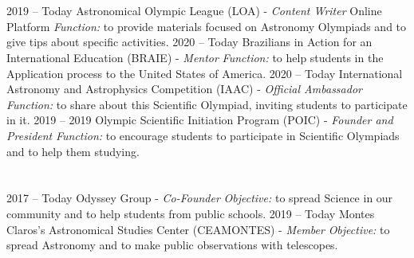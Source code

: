 \documentclass{cv}
\begin{document}
    \section*{}
        \begin{entrylist}
            \entry
                {2019 -- Today}
                {Astronomical Olympic League (LOA) - \textit{Content Writer}}
                {Online Platform}
                {\textit{Function:} to provide materials focused on Astronomy Olympiads and to give tips about specific activities.}
            \entry 
                {2020 -- Today}
                {Brazilians in Action for an International Education (BRAIE) - \textit{Mentor}}
                {}
                {\textit{Function:} to help students in the Application process to the United States of America.}
            \entry
                {2020 -- Today}
                {International Astronomy and Astrophysics Competition (IAAC) - \textit{Official Ambassador}}
                {}
                {\textit{Function:} to share about this Scientific Olympiad, inviting students to participate in it.}
            \entry
                {2019 -- 2019}
                {Olympic Scientific Initiation Program (POIC) - {\textit{Founder and President}}}
                {}
                {\textit{Function:} to encourage students to participate in Scientific Olympiads and to help them studying.}
        \end{entrylist}
    \section*{}
        \begin{entrylist}
            \entry
                {2017 -- Today}
                {Odyssey Group - {\textit{Co-Founder}}}
                {}
                {\textit{Objective:} to spread Science in our community and to help students from public schools.}
            \entry
                {2019 -- Today}
                {Montes Claros's Astronomical Studies Center (CEAMONTES) - {\textit{Member}}}
                {}
                {\textit{Objective:} to spread Astronomy and to make public observations with telescopes.}
        \end{entrylist}
    
\end{document}
